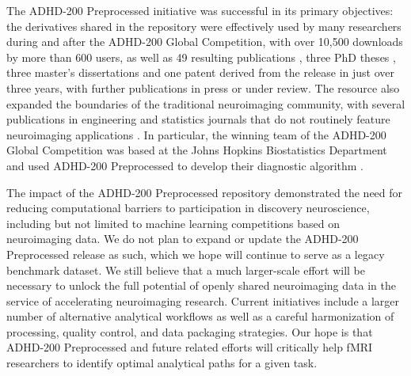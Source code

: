 \documentclass[preprint,12pt,3p]{elsarticle}
\begin{document}
The ADHD-200 Preprocessed initiative was successful in its primary objectives: the derivatives shared in the repository were effectively used by many researchers during and after the ADHD-200 Global Competition, with over 10,500 downloads by more than 600 users, as well as 49 resulting publications \cite{Rangarajan2014, Liang2012, Tabas2014, Rangarajan2015, Mahanand2013, Lifshitz2012, Fujita2013, Ji2011, Li2015, Li2013, Liu2012, DosSantosSiqueira2014, Olivetti2014, Han2015, Wang2013a, Subramanian2013, Dey2014, Bellec2012, Bohland2012, Chang2012, Cheng2012, Colby2012, Dai2012, Dey2012, Eloyan2012, Olivetti2012, Sato2012a, Carmona2015, Carmona2015a, Hou2015, Deshpande2015, She2014, Lavoie-Courchesne2012b, Chen2015, Nunez-Garcia2015, Solmaz2012, Anderson2014, KadkhodaeianBakhtiari2012, Sato2013, Kyeong2015, Sato2012, Takahashi2012, He2013, Kong2013, Yao2013, Yang2015, Ahn2015, Fujita2014, Reiss2014}, three PhD theses \cite{Colby2012a, Dey2014phd, Zhang2012}, three master's dissertations \cite{VanGalenLast2011, Vidal2014, Wang2013} and one patent \cite{Dey2013} derived from the release in just over three years, with further publications in press or under review. The resource also expanded the boundaries of the traditional neuroimaging community, with several publications in engineering and statistics journals that do not routinely feature neuroimaging applications \citep[e.g.][]{Liang2012, Rangarajan2015, Rangarajan2014, Mahanand2013, Ji2011, Li2015, Li2013, Liu2012, Subramanian2013, Hou2015, Deshpande2015, She2014, Chen2015, He2013, Kong2013, Yang2015, Ahn2015}. In particular, the winning team of the ADHD-200 Global Competition was based at the Johns Hopkins Biostatistics Department and used ADHD-200 Preprocessed to develop their diagnostic algorithm \cite{Eloyan2012}.

The impact of the ADHD-200 Preprocessed repository demonstrated the need for reducing computational barriers to participation in discovery neuroscience, including but not limited to machine learning competitions based on neuroimaging data. We do not plan to expand or update the ADHD-200 Preprocessed release as such, which we hope will continue to serve as a legacy benchmark dataset. We still believe that a much larger-scale effort will be necessary to unlock the full potential of openly shared neuroimaging data in the service of accelerating neuroimaging research. Current initiatives include a larger number of alternative analytical workflows as well as a careful harmonization of processing, quality control, and data packaging strategies. Our hope is that ADHD-200 Preprocessed and future related efforts will critically help fMRI researchers to identify optimal analytical paths for a given task. 
\end{document}
